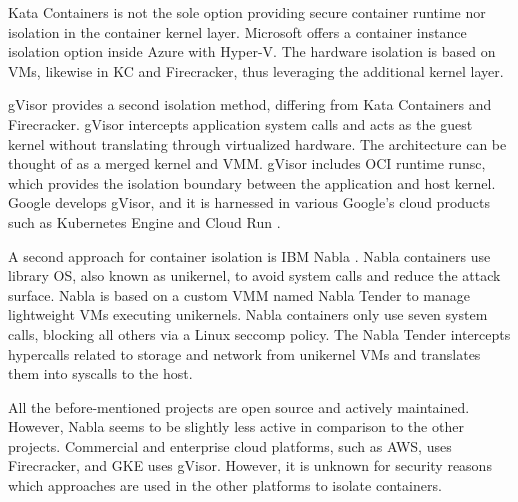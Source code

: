 Kata Containers is not the sole option providing secure container runtime nor isolation in the container kernel layer. Microsoft offers a container instance isolation option inside Azure with Hyper-V. The hardware isolation is based on VMs, likewise in KC and Firecracker, thus leveraging the additional kernel layer. \cite{Hyper-V}

gVisor provides a second isolation method, differing from Kata Containers and Firecracker. gVisor intercepts application system calls and acts as the guest kernel without translating through virtualized hardware. The architecture can be thought of as a merged kernel and VMM. gVisor includes OCI runtime runsc, which provides the isolation boundary between the application and host kernel. Google develops gVisor, and it is harnessed in various Google's cloud products such as Kubernetes Engine \cite{GKE} and Cloud Run \cite{CloudRun}. \cite{Debab2021}\cite{gVisor}

A second approach for container isolation is IBM Nabla \cite{Nabla}. Nabla containers use library OS, also known as unikernel, to avoid system calls and reduce the attack surface. Nabla is based on a custom VMM named Nabla Tender to manage lightweight VMs executing unikernels. Nabla containers only use seven system calls, blocking all others via a Linux seccomp policy. The Nabla Tender intercepts hypercalls related to storage and network from unikernel VMs and translates them into syscalls to the host. \cite{Debab2021}

All the before-mentioned projects are open source and actively maintained. However, Nabla seems to be slightly less active in comparison to the other projects. Commercial and enterprise cloud platforms, such as AWS, uses Firecracker, and GKE uses gVisor. However, it is unknown for security reasons which approaches are used in the other platforms to isolate containers.


